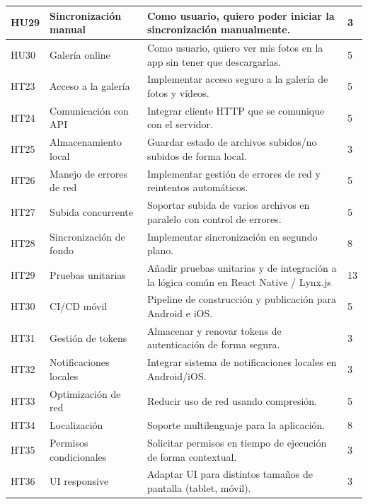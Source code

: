 \begin{tabularx}{\textwidth}{|l|l|>{\raggedright\arraybackslash}X|l|}
    \hline
    HU29 & Sincronización manual & Como usuario, quiero poder iniciar la sincronización manualmente. & 3 \\
    \hline
    HU30 & Galería online & Como usuario, quiero ver mis fotos en la app sin tener que descargarlas. & 5 \\
    \hline
    HT23 & Acceso a la galería & Implementar acceso seguro a la galería de fotos y vídeos. & 5 \\
    \hline
    HT24 & Comunicación con API & Integrar cliente HTTP que se comunique con el servidor. & 5 \\
    \hline
    HT25 & Almacenamiento local & Guardar estado de archivos subidos/no subidos de forma local. & 3 \\
    \hline
    HT26 & Manejo de errores de red & Implementar gestión de errores de red y reintentos automáticos. & 5 \\
    \hline
    HT27 & Subida concurrente & Soportar subida de varios archivos en paralelo con control de errores. & 5 \\
    \hline
    HT28 & Sincronización de fondo & Implementar sincronización en segundo plano. & 8 \\
    \hline
    HT29 & Pruebas unitarias & Añadir pruebas unitarias y de integración a la lógica común en React Native / Lynx.js & 13 \\
    \hline
    HT30 & CI/CD móvil & Pipeline de construcción y publicación para Android e iOS. & 5 \\
    \hline
    HT31 & Gestión de tokens & Almacenar y renovar tokens de autenticación de forma segura. & 3 \\
    \hline
    HT32 & Notificaciones locales & Integrar sistema de notificaciones locales en Android/iOS. & 3 \\
    \hline
    HT33 & Optimización de red & Reducir uso de red usando compresión. & 5 \\
    \hline
    HT34 & Localización & Soporte multilenguaje para la aplicación. & 8 \\
    \hline
    HT35 & Permisos condicionales & Solicitar permisos en tiempo de ejecución de forma contextual. & 3 \\
    \hline
    HT36 & UI responsive & Adaptar UI para distintos tamaños de pantalla (tablet, móvil). & 3 \\
    \hline
\end{tabularx}



